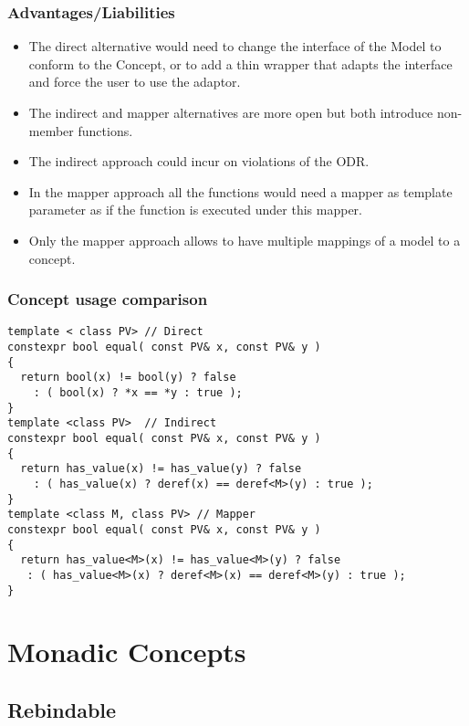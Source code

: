 \documentclass[xcolor=dvipsnames]{beamer}
\begin{document}
\begin{frame}[fragile]
\frametitle{Advantages/Liabilities}

\begin{itemize}
  \item The direct alternative would need to change the interface of the Model to conform to the Concept, or to add a thin wrapper that adapts the interface and force the user to use the adaptor.
  \item The indirect and mapper alternatives are more open but both introduce non-member functions. 
  \item The indirect approach could incur on violations of the ODR.  
  \item In the mapper approach all the functions would need a mapper as template parameter as if the function is executed under this mapper.
  \item Only the mapper approach allows to have multiple mappings of a model to a concept.  
  
\end{itemize}

\end{frame}
\begin{frame}[fragile]
\frametitle{Concept usage comparison}

\begin{lstlisting}
template < class PV> // Direct
constexpr bool equal( const PV& x, const PV& y ) 
{
  return bool(x) != bool(y) ? false 
    : ( bool(x) ? *x == *y : true );
}
template <class PV>  // Indirect
constexpr bool equal( const PV& x, const PV& y ) 
{
  return has_value(x) != has_value(y) ? false 
    : ( has_value(x) ? deref(x) == deref<M>(y) : true );
}
template <class M, class PV> // Mapper
constexpr bool equal( const PV& x, const PV& y ) 
{
  return has_value<M>(x) != has_value<M>(y) ? false 
   : ( has_value<M>(x) ? deref<M>(x) == deref<M>(y) : true );
}
\end{lstlisting}

\end{frame}

\section{Monadic Concepts}
\subsection{Rebindable}
\end{document}
